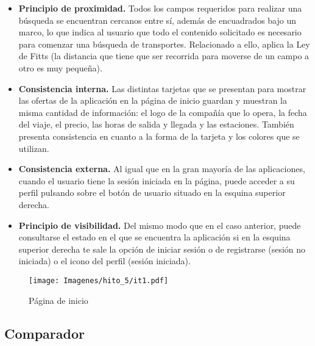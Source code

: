\begin{itemize}
    \item \textbf{Principio de proximidad.} Todos los campos requeridos para realizar una búsqueda se encuentran
        cercanos entre sí, además de encuadrados bajo un marco, lo que indica al usuario que todo el contenido
        solicitado es necesario para comenzar una búsqueda de transportes. Relacionado a ello, aplica la Ley de
        Fitts (la distancia que tiene que ser recorrida para moverse de un campo a otro es muy pequeña).
    \item \textbf{Consistencia interna.} Las distintas tarjetas que se presentan para mostrar las ofertas de la
        aplicación en la página de inicio guardan y muestran la misma cantidad de información: el logo de la compañía
        que lo opera, la fecha del viaje, el precio, las horas de salida y llegada y las estaciones. También presenta
        consistencia en cuanto a la forma de la tarjeta y los colores que se utilizan.
    \item \textbf{Consistencia externa.} Al igual que en la gran mayoría de las aplicaciones, cuando el usuario tiene la sesión
        iniciada en la página, puede acceder a su perfil pulsando sobre el botón de usuario situado en la esquina
        superior derecha.
    \item \textbf{Principio de visibilidad.} Del mismo modo que en el caso anterior, puede consultarse el estado en el que
        se encuentra la aplicación si en la esquina superior derecha te sale la opción de iniciar sesión o de
        registrarse (sesión no iniciada) o el icono del perfil (sesión iniciada).
\end{itemize}

\begin{figure}[H]
    \centering
    \texttt{[image: Imagenes/hito\_5/it1.pdf]}
    \caption{Página de inicio}
    \label{fig:it1_inicio}
\end{figure}

\subsection*{Comparador}

